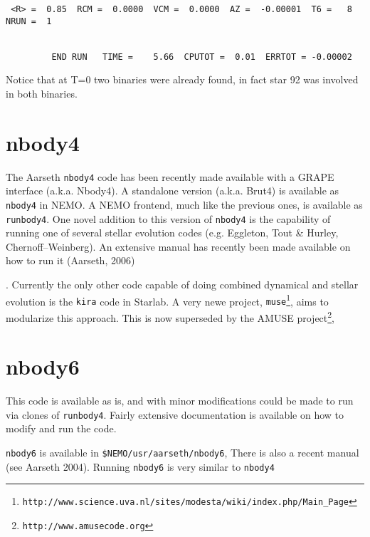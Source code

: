 {{\begin{verbatim}
 <R> =  0.85  RCM =  0.0000  VCM =  0.0000  AZ =  -0.00001  T6 =   8  NRUN =  1
 
 
         END RUN   TIME =    5.66  CPUTOT =  0.01  ERRTOT = -0.00002

\end{verbatim}\normalsize


Notice that at T=0 two binaries were already found, in fact star 92 was
involved in both binaries.


% 
% 
% 

\section{nbody4}

The Aarseth {\tt nbody4} code has been recently made available with a GRAPE
interface (a.k.a. Nbody4). A standalone version  (a.k.a. Brut4) is available
as {\tt nbody4} in NEMO. A NEMO frontend, much like the previous ones, is 
available as {\tt runbody4}. One novel addition to this version of {\tt nbody4} is the
capability of running one of several stellar evolution codes
(e.g. Eggleton, Tout \& Hurley, Chernoff--Weinberg). An extensive manual
has recently been made available on how to run it (Aarseth, 2006)}.
Currently the only other
code capable of doing combined dynamical and stellar evolution
is the {\tt kira} code in Starlab.  A very newe project,
{\tt muse}\footnote{{\tt http://www.science.uva.nl/sites/modesta/wiki/index.php/Main\_Page}},
aims to modularize this approach. This is now superseded by 
the AMUSE project\footnote{{\tt http://www.amusecode.org}},

\section{nbody6}

This code is available as is, and with minor modifications could be made to run
via clones of {\tt runbody4}. Fairly extensive documentation is available on how
to modify and run the code.

{\tt nbody6} is available in {\tt \$NEMO/usr/aarseth/nbody6}, 
There is also a recent manual (see Aarseth 2004). Running {\tt nbody6}
is very similar to {\tt nbody4}


}
